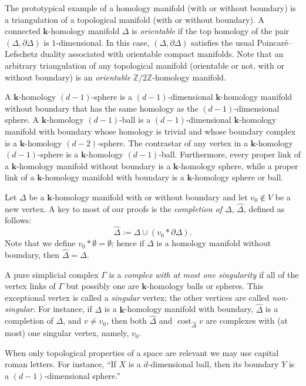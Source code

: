 \documentclass[ALCO,ThmDefs,Unicode,epreuves]{cedram}
\DeclareMathOperator\cost{cost}
\newcommand{\complet}[1]{\hat{#1}}
\newcommand{\field}{\mathbf{k}}
\newcommand{\Z}{{\mathbb Z}}
\begin{document}
The prototypical example of a homology manifold (with or without boundary) is a triangulation of a topological manifold (with or without boundary). A connected $\field$-homology manifold $\Delta$ is \emph{orientable} if the top homology of the pair $(\Delta, \partial \Delta)$ is $1$-dimensional. In this case, $(\Delta, \partial \Delta)$ satisfies the usual Poincar{\'e}--Lefschetz duality associated with orientable compact manifolds. Note that an arbitrary triangulation of any topological manifold (orientable or not, with or without boundary) is an \emph{orientable} $\Z/2\Z$-homology manifold.

A $\field$-homology $(d-1)$-sphere is a $(d-1)$-dimensional $\field$-homology manifold without boundary that has the same homology as the $(d-1)$-dimensional sphere. A $\field$-homology $(d-1)$-ball is a $(d-1)$-dimensional $\field$-homology manifold with boundary whose homology is trivial and whose boundary complex is a $\field$-homology $(d-2)$-sphere. The contrastar of any vertex in a $\field$-homology $(d-1)$-sphere is a $\field$-homology $(d-1)$-ball. Furthermore, every proper link of a $\field$-homology manifold without boundary is a $\field$-homology sphere, while a proper link of a $\field$-homology manifold with boundary is a $\field$-homology sphere or ball.

Let $\Delta$ be a $\field$-homology manifold with or without boundary and let $v_0\not\in V$ be a new vertex. A key to most of our proofs is the \emph{completion of $\Delta$}, $\complet{\Delta}$, defined as follows:
\[
\complet{\Delta}:=\Delta\cup (v_0\ast\partial\Delta).
\]
 Note that we define $v_0\ast\emptyset =\emptyset$; hence if $\Delta$ is a homology manifold without boundary, then $\complet{\Delta}=\Delta$. 

A pure simplicial complex $\Gamma$ is a \emph{complex with at most one singularity} if all of the vertex links of $\Gamma$ but possibly one are $\field$-homology balls or spheres. This exceptional vertex is called a \emph{singular} vertex; the other vertices are called \emph{non-singular}. For instance, if $\Delta$ is a $\field$-homology manifold with boundary, $\complet{\Delta}$ is a completion of $\Delta$, and $v\neq v_0$, then both $\complet{\Delta}$ and $\cost_{\complet{\Delta}}v$ are complexes with (at most) one singular vertex, namely, $v_0$.

When only topological properties of a space are relevant we may use capital roman letters. For instance, ``If $X$ is a $d$-dimensional ball, then its boundary $Y$ is a $(d-1)$-dimensional sphere.''
\end{document}
